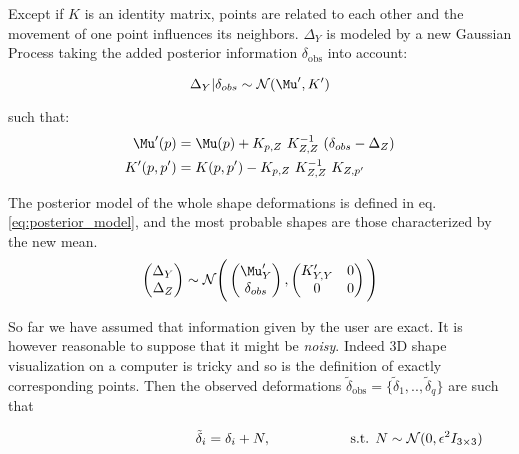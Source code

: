Except if $K$ is  an identity matrix, points are related to each other and the movement of one point influences its neighbors. $\Delta_Y$ is modeled by a new Gaussian Process taking the added posterior information $\delta_{\text{obs}}$ into account:

\begin{equation}
	\Delta_Y | \delta_{obs} \sim \mathcal N( \Mu', K')
\end{equation}

such that: 
\begin{equation}
	\label{eq:posterior_info_exacte}
	\begin{split}
		\Mu'(p) &= \Mu(p) + K_{p,Z} \ K_{Z,Z}^{-1} \ (\delta_{obs} - \Delta_Z) \\
		K'(p,p') &= K(p,p') - K_{p,Z} \ K_{Z,Z}^{-1} \ K_{Z,p'}
	\end{split}
\end{equation}

The posterior model of the whole shape deformations is defined in eq. \ref{eq:posterior_model}, and the most probable shapes are those characterized by the new mean. 
\begin{equation}
	\label{eq:posterior_model} 
	\begin{pmatrix} \Delta_Y \\ \Delta_Z \end{pmatrix}
	\sim\mathcal N \Bigg(
	\begin{pmatrix} \Mu_Y' \\ \delta_{obs} \end{pmatrix}, 
	\begin{pmatrix} 
		K_{Y,Y}' & 0 \\ 
		0  & 0
	\end{pmatrix} 
	\Bigg)
\end{equation} 

So far we have assumed that information given by the user are exact. It is however reasonable to suppose that it might be \textit{noisy}. Indeed 3D shape visualization on a computer is tricky and so is the definition of exactly corresponding points.
Then the observed deformations $\tilde{\delta}_\text{obs} = \{\tilde{\delta}_1,..,\tilde{\delta}_q\}$ are such that 

\begin{equation}
	\hspace*{4cm}
	\tilde{\delta}_i = \delta_i + N, 
	\hspace*{2cm} \text{s.t. } N \sim \mathcal{N}(0, \epsilon^2 I_{3\times3})
\end{equation}

